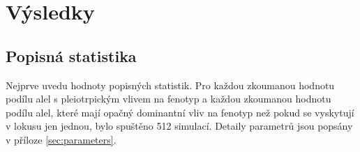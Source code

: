 \chapter{Výsledky}

%
%
%
%
%
%
%


\section{Popisná statistika}

Nejprve uvedu hodnoty popisných statistik. Pro každou zkoumanou hodnotu podílu alel s pleiotrpickým vlivem na fenotyp a
každou zkoumanou hodnotu podílu alel, které mají opačný dominantní vliv na fenotyp než pokud se vyskytují v lokusu jen
jednou, bylo spuštěno 512 simulací. Detaily parametrů jsou popsány v příloze \ref{sec:parameters}.

